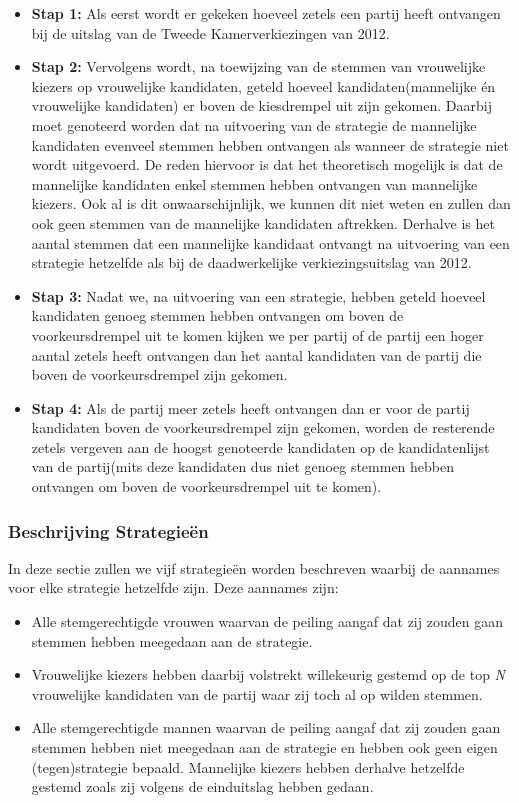 \begin{itemize}
	\item
\textbf{Stap 1:} Als eerst wordt er gekeken hoeveel zetels een partij heeft ontvangen bij de uitslag van de Tweede Kamerverkiezingen van 2012. 
	\item
\textbf{Stap 2:} Vervolgens wordt, na toewijzing van de stemmen van vrouwelijke kiezers op vrouwelijke kandidaten, geteld hoeveel kandidaten(mannelijke én vrouwelijke kandidaten) er boven de kiesdrempel uit zijn gekomen. Daarbij moet genoteerd worden dat na uitvoering van de strategie de mannelijke kandidaten evenveel stemmen hebben ontvangen als wanneer de strategie niet wordt uitgevoerd. De reden hiervoor is dat het theoretisch mogelijk is dat de mannelijke kandidaten enkel stemmen hebben ontvangen van mannelijke kiezers. Ook al is dit onwaarschijnlijk, we kunnen dit niet weten en zullen dan ook geen stemmen van de mannelijke kandidaten aftrekken. Derhalve is het aantal stemmen dat een mannelijke kandidaat ontvangt na uitvoering van een strategie hetzelfde als bij de daadwerkelijke verkiezingsuitslag van 2012.
	\item
\textbf{Stap 3:} Nadat we, na uitvoering van een strategie, hebben geteld hoeveel kandidaten genoeg stemmen hebben ontvangen om boven de voorkeursdrempel uit te komen kijken we per partij of de partij een hoger aantal zetels heeft ontvangen dan het aantal kandidaten van de partij die boven de voorkeursdrempel zijn gekomen. 
	\item
\textbf{Stap 4:} Als de partij meer zetels heeft ontvangen dan er voor de partij kandidaten boven de voorkeursdrempel zijn gekomen, worden de resterende zetels vergeven aan de hoogst genoteerde kandidaten op de kandidatenlijst van de partij(mits deze kandidaten dus niet genoeg stemmen hebben ontvangen om boven de voorkeursdrempel uit te komen).
\end{itemize}


\subsubsection*{Beschrijving Strategie\"{e}n} \label{besS}
In deze sectie zullen we vijf strategie\"{e}n worden beschreven waarbij de aannames voor elke strategie hetzelfde zijn. Deze aannames zijn:

\begin{itemize}
	\item 
Alle stemgerechtigde vrouwen waarvan de peiling aangaf dat zij zouden gaan stemmen hebben meegedaan aan de strategie.
	\item
Vrouwelijke kiezers hebben daarbij volstrekt willekeurig gestemd op de top \textit{N} vrouwelijke kandidaten van de partij waar zij toch al op wilden stemmen.	
	\item
Alle stemgerechtigde mannen waarvan de peiling aangaf dat zij zouden gaan stemmen hebben niet meegedaan aan de strategie en hebben ook geen eigen (tegen)strategie bepaald. Mannelijke kiezers hebben derhalve hetzelfde gestemd zoals zij volgens de einduitslag hebben gedaan. 
\end{itemize}


